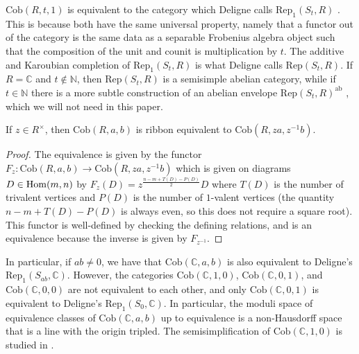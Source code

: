 \documentclass[12pt]{amsart}
\begin{document}
\begin{remark}
    $\mathrm{Cob}(R,t,1)$ is equivalent to the category which Deligne calls $\mathrm{Rep}_1(S_t,R)$ \cite{MR2348906}. This is because both have the same universal property, namely that a functor out of the category is the same data as a separable Frobenius algebra object such that the composition of the unit and counit is multiplication by $t$. The additive and Karoubian completion of $\mathrm{Rep}_1(S_t,R)$ is what Deligne calls $\mathrm{Rep}(S_t,R)$. If $R = \mathbb{C}$ and $t \notin \mathbb{N}$, then $\mathrm{Rep}(S_t,R)$ is a semisimple abelian category, while if $t \in \mathbb{N}$ there is a more subtle construction of an abelian envelope $\mathrm{Rep}(S_t,R)^{\mathrm{ab}}$ \cite{MR2348906, MR2737787,1601.03426}, which we will not need in this paper.
\end{remark}

\begin{lemma}
    If $z \in R^\times$, then $\mathrm{Cob}(R,a, b)$ is ribbon equivalent to $\mathrm{Cob}(R,za, z^{-1}b)$.
\end{lemma}
\begin{proof}
    The equivalence is given by the functor $F_z: \mathrm{Cob}(R,a, b) \rightarrow \mathrm{Cob}(R,za, z^{-1}b)$ which is given on diagrams $D \in \operatorname{Hom}(m,n)$ by $F_z(D) = z^{\frac{n-m+T(D)-P(D)}{2}} D$ where $T(D)$ is the number of trivalent vertices and $P(D)$ is the number of $1$-valent vertices (the quantity $n-m+T(D)-P(D)$ is always even, so this does not require a square root). This functor is well-defined by checking the defining relations, and is an equivalence because the inverse is given by $F_{z^{-1}}$.
\end{proof}

\begin{remark}
In particular, if $ab \neq 0$, we have that $\mathrm{Cob}(\mathbb{C},a,b)$ is also equivalent to Deligne's $\mathrm{Rep}_1(S_{ab},\mathbb{C})$. However, the categories $\mathrm{Cob}(\mathbb{C},1,0)$, $\mathrm{Cob}(\mathbb{C},0,1)$, and $\mathrm{Cob}(\mathbb{C},0,0)$ are not equivalent to each other, and only $\mathrm{Cob}(\mathbb{C},0,1)$ is equivalent to Deligne's $\mathrm{Rep}_1(S_0,\mathbb{C})$. In particular, the moduli space of equivalence classes of $\mathrm{Cob}(\mathbb{C},a,b)$ up to equivalence is a non-Hausdorff space that is a line with the origin tripled. The semisimplification of $\mathrm{Cob}(\mathbb{C},1,0)$ is studied in \cite[\S 5]{MR4450143}.
\end{remark}
\end{document}
